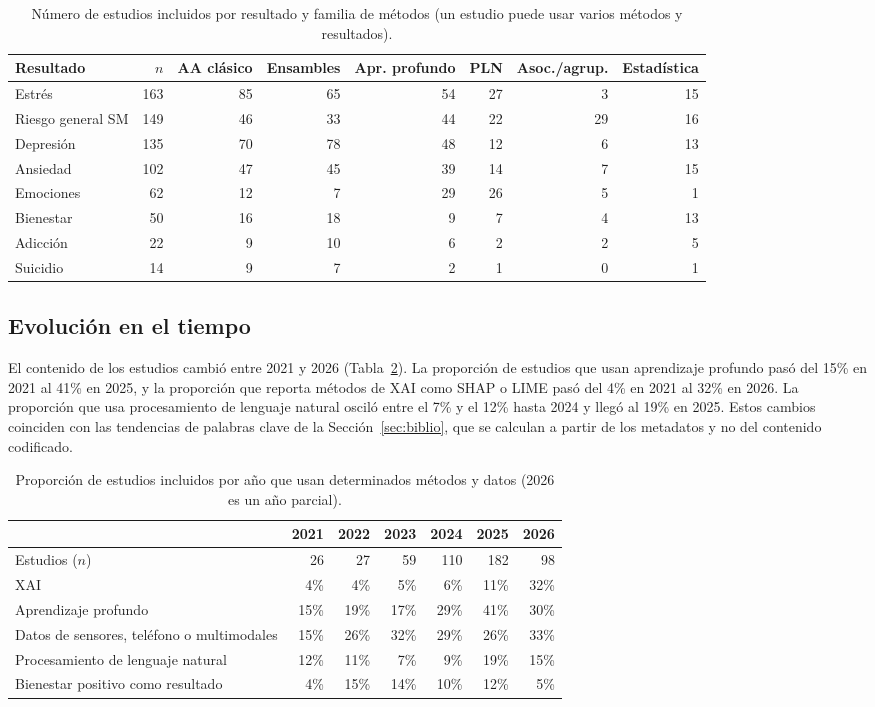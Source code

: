 \documentclass[11pt,a4paper]{article}
\begin{document}
\begin{table}[htbp]
\centering
\caption{Número de estudios incluidos por resultado y familia de métodos (un estudio puede usar varios métodos y resultados).}
\label{tab:methods}
\small
\setlength{\tabcolsep}{3.5pt}
\begin{tabular}{lrrrrrrr}
\toprule
Resultado & $n$ & AA clásico & Ensambles & Apr. profundo & PLN & Asoc./agrup. & Estadística \\
\midrule
Estrés & 163 & 85 & 65 & 54 & 27 & 3 & 15 \\
Riesgo general SM & 149 & 46 & 33 & 44 & 22 & 29 & 16 \\
Depresión & 135 & 70 & 78 & 48 & 12 & 6 & 13 \\
Ansiedad & 102 & 47 & 45 & 39 & 14 & 7 & 15 \\
Emociones & 62 & 12 & 7 & 29 & 26 & 5 & 1 \\
Bienestar & 50 & 16 & 18 & 9 & 7 & 4 & 13 \\
Adicción & 22 & 9 & 10 & 6 & 2 & 2 & 5 \\
Suicidio & 14 & 9 & 7 & 2 & 1 & 0 & 1 \\
\bottomrule
\end{tabular}
\end{table}

\subsection{Evolución en el tiempo}

El contenido de los estudios cambió entre 2021 y 2026 (Tabla~\ref{tab:years}). La proporción de estudios que usan aprendizaje profundo pasó del 15\% en 2021 al 41\% en 2025, y la proporción que reporta métodos de XAI como SHAP \cite{lundberg2017shap} o LIME \cite{ribeiro2016lime} pasó del 4\% en 2021 al 32\% en 2026. La proporción que usa procesamiento de lenguaje natural osciló entre el 7\% y el 12\% hasta 2024 y llegó al 19\% en 2025. Estos cambios coinciden con las tendencias de palabras clave de la Sección~\ref{sec:biblio}, que se calculan a partir de los metadatos y no del contenido codificado.

\begin{table}[htbp]
\centering
\caption{Proporción de estudios incluidos por año que usan determinados métodos y datos (2026 es un año parcial).}
\label{tab:years}
\small
\begin{tabular}{lrrrrrr}
\toprule
 & 2021 & 2022 & 2023 & 2024 & 2025 & 2026 \\
\midrule
Estudios ($n$) & 26 & 27 & 59 & 110 & 182 & 98 \\
XAI & 4\% & 4\% & 5\% & 6\% & 11\% & 32\% \\
Aprendizaje profundo & 15\% & 19\% & 17\% & 29\% & 41\% & 30\% \\
Datos de sensores, teléfono o multimodales & 15\% & 26\% & 32\% & 29\% & 26\% & 33\% \\
Procesamiento de lenguaje natural & 12\% & 11\% & 7\% & 9\% & 19\% & 15\% \\
Bienestar positivo como resultado & 4\% & 15\% & 14\% & 10\% & 12\% & 5\% \\
\bottomrule
\end{tabular}
\end{table}
\end{document}
